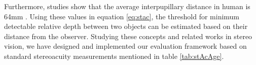 Furthermore, studies show that the average interpupillary distance in human is 64mm \cite{how95}. 
Using these values in equation \ref{eq:stac}, the threshold for minimum detectable relative depth 
between two objects can be estimated based on their distance from the observer. \newline 
Studying these concepts and related works in stereo vision, we have designed and implemented our evaluation framework based on standard
stereoacuity measurements mentioned in table \ref{tab:stAcAge}.
